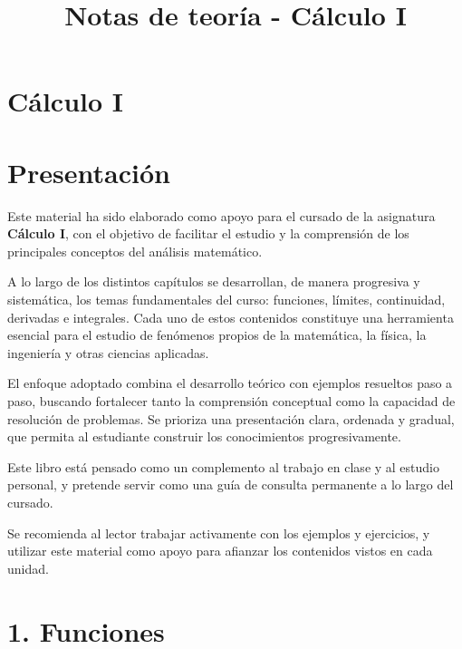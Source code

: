 \documentclass[
  letterpaper,
]{book}
\title{Notas de teoría - Cálculo I}
\author{}
\date{}
\renewcommand*\contentsname{Table of contents}
\newcommand\contentsname{Table of contents}
\theoremstyle{plain}
\theoremstyle{remark}
\begin{document}
\frontmatter
\maketitle

\renewcommand*\contentsname{Table of contents}
{
\setcounter{tocdepth}{2}
\tableofcontents
}

\mainmatter
{}

\chapter{Cálculo I}\label{cuxe1lculo-i}


\chapter{Presentación}\label{presentaciuxf3n}

Este material ha sido elaborado como apoyo para el cursado de la
asignatura \textbf{Cálculo I}, con el objetivo de facilitar el estudio y
la comprensión de los principales conceptos del análisis matemático.

A lo largo de los distintos capítulos se desarrollan, de manera
progresiva y sistemática, los temas fundamentales del curso: funciones,
límites, continuidad, derivadas e integrales. Cada uno de estos
contenidos constituye una herramienta esencial para el estudio de
fenómenos propios de la matemática, la física, la ingeniería y otras
ciencias aplicadas.

El enfoque adoptado combina el desarrollo teórico con ejemplos resueltos
paso a paso, buscando fortalecer tanto la comprensión conceptual como la
capacidad de resolución de problemas. Se prioriza una presentación
clara, ordenada y gradual, que permita al estudiante construir los
conocimientos progresivamente.

Este libro está pensado como un complemento al trabajo en clase y al
estudio personal, y pretende servir como una guía de consulta permanente
a lo largo del cursado.

Se recomienda al lector trabajar activamente con los ejemplos y
ejercicios, y utilizar este material como apoyo para afianzar los
contenidos vistos en cada unidad.


\chapter{1. Funciones}\label{funciones}
\end{document}
